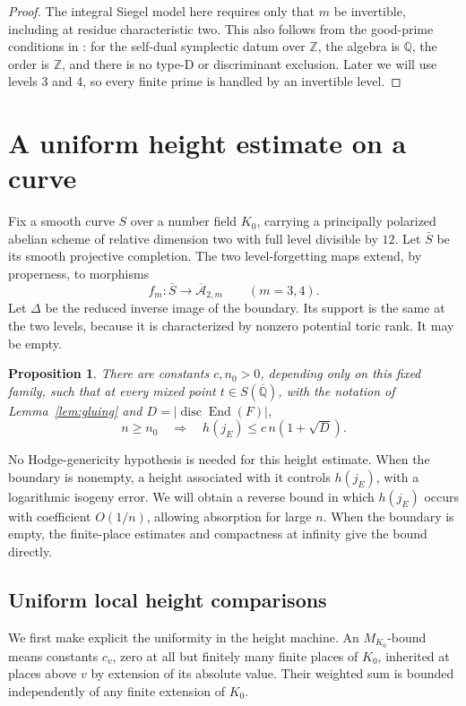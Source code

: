 \documentclass[11pt,a4paper]{article}
\numberwithin{equation}{section}
\newtheorem{proposition}[theorem]{Proposition}
\theoremstyle{definition}
\theoremstyle{remark}
\newcommand{\A}{\mathcal A}
\newcommand{\Q}{\mathbb Q}
\newcommand{\Z}{\mathbb Z}
\newcommand{\Qbar}{\overline{\mathbb Q}}
\newcommand{\End}{\operatorname{End}}
\newcommand{\disc}{\operatorname{disc}}
\begin{document}
\begin{proof}
The integral Siegel model here requires only that \(m\) be invertible,
including at residue characteristic two. This also follows from
the good-prime conditions in \cite[Definition~1.4.1.1]{Lan}:
for the self-dual symplectic datum over \(\Z\), the algebra is
\(\Q\), the order is \(\Z\), and there is no type-D or discriminant
exclusion. Later we will use levels \(3\) and \(4\), so every finite
prime is handled by an invertible level.
\end{proof}

\section{A uniform height estimate on a curve}\label{sec:height}

Fix a smooth curve \(S\) over a number field \(K_0\), carrying a
principally polarized abelian scheme of relative dimension two with
full level divisible by \(12\). Let \(\bar S\) be its smooth
projective completion. The two level-forgetting maps extend, by
properness, to morphisms
\[
 f_m:\bar S\longrightarrow\overline{\A}_{2,m}\qquad(m=3,4).
\]
Let \(\Delta\) be the reduced inverse image of the boundary.
Its support is the same at the two levels, because it is characterized
by nonzero potential toric rank. It may be empty.

\begin{proposition}\label{prop:height}
There are constants \(c,n_0>0\), depending only on this fixed family,
such that at every mixed point \(t\in S(\Qbar)\), with the notation
of Lemma~\ref{lem:gluing} and \(D=|\disc\End(F)|\),
\[
 n\ge n_0\quad\Longrightarrow\quad h(j_E)\le c\,n(1+\sqrt D).
\]
\end{proposition}

No Hodge-genericity hypothesis is needed for this height estimate.
When the boundary is nonempty, a height associated with it controls
\(h(j_E)\), with a logarithmic isogeny error. We will obtain a reverse
bound in which \(h(j_E)\) occurs with coefficient \(O(1/n)\), allowing
absorption for large \(n\). When the boundary is empty, the finite-place
estimates and compactness at infinity give the bound directly.

\subsection{Uniform local height comparisons}\label{subsec:model}

We first make explicit the uniformity in the height machine.
An \(M_{K_0}\)-bound means constants \(c_v\), zero at all but finitely
many finite places of \(K_0\), inherited at places above \(v\) by
extension of its absolute value. Their weighted sum is bounded
independently of any finite extension of \(K_0\).
\end{document}
